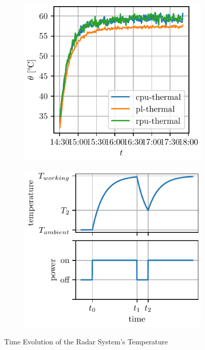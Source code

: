 \begin{figure}
    \begin{subfigure}[t]{0.45\textwidth}
        \centering
        \includegraphics[width=\textwidth]{../figures/actual_temperature.pdf}
        \label{fig:act_temp}
    \end{subfigure}
    \begin{subfigure}[t]{0.45\textwidth}
        \centering
        \includegraphics[width=\textwidth]{../figures/expected_temperature.pdf}
        \label{fig:exp_temp}
    \end{subfigure}
    \caption{Time Evolution of the Radar System's Temperature}
\end{figure}


